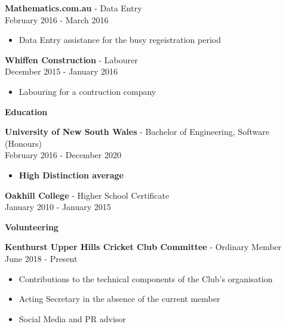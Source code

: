 \documentclass[a4paper]{article}
\newcommand{\minititle}[1]{{\Large \begin{center} \textbf{#1} \end{center}} \vspace{0.2cm}}
\newcommand{\resumeEntry}[3]{{\large \textbf{#1} - #2} \\ \small{#3} }
\begin{document}
\begin{minipage}[t]{0.6\linewidth}
{\begin{itemize}
        \end{itemize}
        \vspace{0.3cm}
        \resumeEntry{Mathematics.com.au}{Data Entry}{February 2016 - March 2016}
        \begin{itemize}
            \setlength\itemsep{0.03cm}
            \item Data Entry assistance for the busy regeistration period
        \end{itemize}
        \vspace{0.3cm}
        \resumeEntry{Whiffen Construction}{Labourer}{December 2015 - January 2016}
        \begin{itemize}
            \setlength\itemsep{0.03cm}
            \item Labouring for a contruction company
        \end{itemize}
    }
    {
        \vspace{0.1cm}
        \minititle{Education}
        \resumeEntry{University of New South Wales}{Bachelor of Engineering, Software (Honours)}{February 2016 - December 2020}
        \begin{itemize}
            \setlength\itemsep{0.03cm}
            \item \textbf{High Distinction average}
        \end{itemize}
        \vspace{0.4cm}
        \resumeEntry{Oakhill College}{Higher School Certificate}{January 2010 - January 2015}
    }
    {
        \vspace{0.05cm}
        \minititle{Volunteering}
        \resumeEntry{Kenthurst Upper Hills Cricket Club Committee}{Ordinary Member}{June 2018 - Present}
        \begin{itemize}
            \setlength\itemsep{0.03cm}
            \item Contributions to the technical components of the Club's organisation
            \item Acting Secretary in the absence of the current member
            \item Social Media and PR advisor
        \end{itemize}
        \vspace{0.4cm}
        \iffalse
        \resumeEntry{The UNSW Tea \& Coffee Society}{Vice-President (previously President, Secretary)}{October 2016 - Present}
        \begin{itemize}
            \setlength\itemsep{0.03cm}
            \item Coordinating and organising weekly gatherings for a society with over 500 members 
            \item Led the logistics and organisation of a high tea outing for the society at QVB tea room, a successful event with over 100 guests
        \end{itemize}
        \fi
    }
\end{minipage}\hspace{0.8cm}
\end{document}

